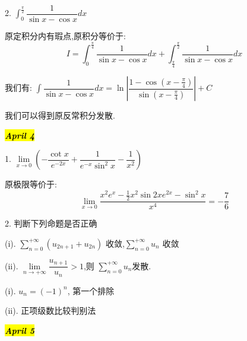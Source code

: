 2. $\int_{0}^{\frac{\pi}{2}}\dfrac{1}{\sin x-\cos x}dx$
\begin{solution}
	
	原定积分内有瑕点,原积分等价于: 
	$$I=\int_{0}^{\frac{\pi}{4}}\frac{1}{\sin x-\cos x}dx+\int_{\frac{\pi}{4}}^{\frac{\pi}{2}}\frac{1}{\sin x-\cos x}dx$$
	
	我们有: $\int\dfrac{1}{\sin x-\cos x}dx=\ln|\dfrac{1-\cos(x-\frac{\pi}{4})}{\sin(x-\frac{\pi}{4})}|+C$
	
	我们可以得到原反常积分发散.
\end{solution}

\hl{\textbf{\textit{April 4}}}

1. $\lim\limits_{x\rightarrow 0}\left( -\dfrac{\cot x}{e^{-2x}}+\dfrac{1}{e^{-x}\sin^2 x}-\dfrac{1}{x^2}\right) $
\begin{solution}
	
	原极限等价于: 
	$$\lim\limits_{x\rightarrow 0}\frac{x^2e^{x}-\frac{1}{2}x^2\sin 2xe^{2x}-\sin^2 x}{x^4}=-\frac{7}{6}$$
\end{solution}

2. 判断下列命题是否正确 

(i). $\sum\limits_{n=0}^{+\infty}(u_{2n+1}+u_{2n})$ 收敛,$\sum\limits_{n=0}^{+\infty}u_{n}$ 收敛

(ii). $\lim\limits_{n\rightarrow +\infty}\dfrac{u_{n+1}}{u_{n}}>1$,则 $\sum\limits_{n=0}^{+\infty}u_{n}$发散.
\begin{solution}
	
	(i). $u_{n}=(-1)^{n}$, 第一个排除
	
	(ii). 正项级数比较判别法
\end{solution}

\hl{\textbf{\textit{April 5}}}

